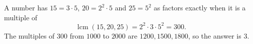A number has $15=3\cdot5$, $20=2^2\cdot5$ and $25=5^2$ as factors exactly when it is a multiple of
\[
\operatorname{lcm}(15,20,25)=2^2\cdot3\cdot5^2=300 .
\]
The multiples of $300$ from $1000$ to $2000$ are $1200,1500,1800$, so the answer is $\boxed{3}$.
